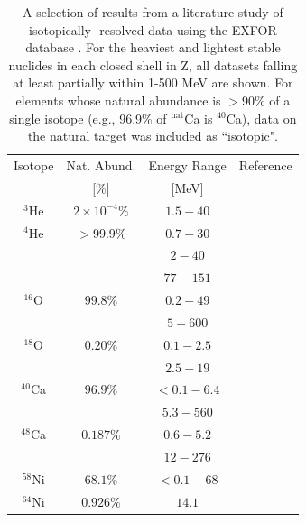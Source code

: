 \begin{table}[ht]
    \caption{A selection of results from a literature study of isotopically-
    resolved \totEs data using the EXFOR database \cite{EXFORDatabase}. For the
    heaviest and lightest stable nuclides in each closed shell in Z, all
    datasets falling at least partially within 1-500 MeV are shown. For elements
    whose natural abundance is $>$90\% of a single isotope (e.g.,
    96.9\% of $^{\text{nat}}$Ca is $^{40}$Ca), \totEs data on the natural
    target was included as ``isotopic".} \label{tab:title}
    \label{IsotopicCrossSectionTable}
    \begin{center}
        \begin{tabular}{ c c c c }
            \hline
            Isotope & Nat. Abund. & Energy Range & Reference\\
                    & [\%] & [MeV] & \\

            \hline

            $^{3}$He & $2\times 10^{-4}\%$ & $1.5 - 40$ & \cite{Haesner1983}\\
            $^{4}$He & $>99.9\%$ & $0.7-30$ & \cite{Goulding1973}\\
            & & $2-40$ & \cite{Haesner1983}\\
            & & $77-151$ & \cite{Measday1966}\\

            $^{16}$O & $99.8\%$ & $0.2-49$ & \cite{Perey1972}\\
            & & $5-600$ & \cite{Finlay1993}\\

            $^{18}$O & $0.20\%$ & $0.1-2.5$ & \cite{Vaughn1965}\\
            & & $2.5-19$ & \cite{Salisbury1965}\\

            $^{40}$Ca & $96.9\%$ & $<0.1-6.4$ & \cite{Johnson1973}\\
            & & $5.3-560$ & \cite{Abfalterer2001}\\

            $^{48}$Ca & $0.187\%$ & $0.6-5.2$ & \cite{Harvey1985}\\
            & & $12-276$ & \cite{Shane2010}\\

            $^{58}$Ni & $68.1\%$ & $<0.1-68$ & \cite{Perey1993}\\

            $^{64}$Ni & $0.926\%$ & $14.1$ & \cite{Dukarevich1967}\\


\end{tabular}
\end{center}
\end{table}
